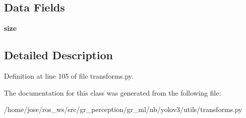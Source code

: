 \subsection*{Data Fields}
\begin{DoxyCompactItemize}
\item 
\mbox{\label{classutils_1_1transforms_1_1Resize_aea0c36dba70c2664a0751d59c914af99}} 
{\bfseries size}
\end{DoxyCompactItemize}


\subsection{Detailed Description}


Definition at line 105 of file transforms.\+py.



The documentation for this class was generated from the following file\+:\begin{DoxyCompactItemize}
\item 
/home/jose/ros\+\_\+ws/src/gr\+\_\+perception/gr\+\_\+ml/nb/yolov3/utils/transforms.\+py\end{DoxyCompactItemize}
